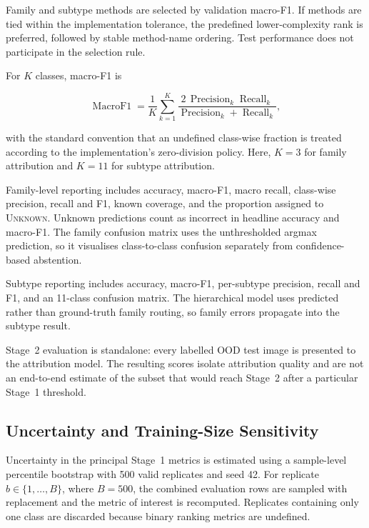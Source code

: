 \documentclass[fleqn,12pt]{olplainarticle}
\begin{document}
Family and subtype methods are selected by validation macro-F1. If methods are
tied within the implementation tolerance, the predefined lower-complexity
rank is preferred, followed by stable method-name ordering. Test performance
does not participate in the selection rule.

For $K$ classes, macro-F1 is

\begin{equation}
    \operatorname{MacroF1}
    =
    \frac{1}{K}
    \sum_{k=1}^{K}
    \frac{
        2\,\operatorname{Precision}_k
        \operatorname{Recall}_k
    }{
        \operatorname{Precision}_k
        +
        \operatorname{Recall}_k
    },
    \label{eq:protocol_macro_f1}
\end{equation}

with the standard convention that an undefined class-wise fraction is treated
according to the implementation's zero-division policy. Here, $K=3$ for
family attribution and $K=11$ for subtype attribution.

Family-level reporting includes accuracy, macro-F1, macro recall, class-wise
precision, recall and F1, known coverage, and the proportion assigned to
\textsc{Unknown}. Unknown predictions count as incorrect in headline accuracy
and macro-F1. The family confusion matrix uses the unthresholded argmax
prediction, so it visualises class-to-class confusion separately from
confidence-based abstention.

Subtype reporting includes accuracy, macro-F1, per-subtype precision, recall
and F1, and an 11-class confusion matrix. The hierarchical model uses predicted
rather than ground-truth family routing, so family errors propagate into the
subtype result.

Stage~2 evaluation is standalone: every labelled OOD test image is presented
to the attribution model. The resulting scores isolate attribution quality
and are not an end-to-end estimate of the subset that would reach Stage~2
after a particular Stage~1 threshold.

\subsection{Uncertainty and Training-Size Sensitivity}
\label{subsec:uncertainty_analysis}

Uncertainty in the principal Stage~1 metrics is estimated using a
sample-level percentile bootstrap with 500 valid replicates and seed 42. For
replicate $b\in\{1,\ldots,B\}$, where $B=500$, the combined evaluation rows
are sampled with replacement and the metric of interest is recomputed.
Replicates containing only one class are discarded because binary ranking
metrics are undefined.
\end{document}

